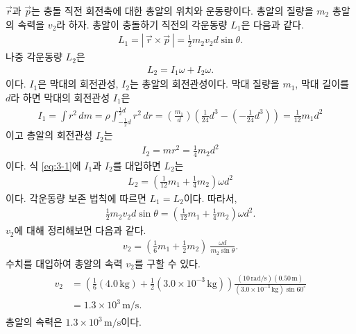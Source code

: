 \documentclass[floatfix,nofootinbib,superscriptaddress,fleqn]{revtex4-2}
\begin{document}
$\vec{r}$과 $\vec{p}$는 충돌 직전 회전축에 대한 총알의 위치와 운동량이다.
 총알의 질량을 $m_2$ 총알의 속력을 $v_2$라 하자.
총알이 충돌하기 직전의 각운동량 $L_1$은 다음과 같다.
\begin{align}
  L_1 =|\,\vec{r}\times\vec{p}\,|=\frac{1}{2} m_2v_2d\sin\theta.
\end{align}
나중 각운동량 $L_2$은
\begin{align}\label{eq:3-1}
  L_2 = I_1\omega+ I_2\omega.
\end{align}
이다. $I_1$은 막대의 회전관성, $I_2$는 총알의 회전관성이다.
막대 질량을 $m_1$, 막대 길이를 $d$라 하면 막대의 회전관성 $I_1$은
\begin{align}
  I_1 = \int r^2\,dm = \rho\int_{-\frac{1}{2}d} ^{\frac{1}{2}d}r^2\,dr
  =\left(\frac{m_1}{d}\right)\left(\frac{1}{24}d^3
  -\left(-\frac{1}{24}d^3\right)\right)
  =\frac{1}{12}m_1d^2
\end{align}
이고 총알의 회전관성 $I_2$는
\begin{align}
  I_2 =  mr^2 = \frac{1}{4}m_2d^2
\end{align}
이다. 식 \eqref{eq:3-1}에 $I_1$과 $I_2$를 대입하면 $L_2$는
\begin{align}
  L_2 = \left(\frac{1}{12}m_1+\frac{1}{4}m_2\right)\omega d^2
\end{align}
이다. 각운동량 보존 법칙에 따르면 $L_1=L_2$이다. 따라서,
\begin{align}
  \frac{1}{2}m_2v_2d\sin\theta=\left(\frac{1}{12}m_1
  +\frac{1}{4}m_2\right)\omega d^2.
\end{align}
$v_2$에 대해 정리해보면 다음과 같다.
\begin{align}
  v_2 = \left(\frac{1}{6}m_1+\frac{1}{2}m_2\right)\
  \frac{\omega d}{m_2\sin\theta}.
\end{align}
수치를 대입하여 총알의 속력 $v_2$를 구할 수 있다.
\begin{align}
  \begin{split}
    v_2 &= \left(\frac{1}{6}(4.0\,\mathrm{kg})
    +\frac{1}{2}(3.0\times 10^{-3}\,\mathrm{kg})\right)
    \frac{(10\,\mathrm{rad/s}) (0.50\,\mathrm{m})}
    {(3.0\times 10^{-3}\,\mathrm{kg})\sin{60^\circ}}  \\
    &= 1.3\times 10^3\,\mathrm{m/s}.
  \end{split}
\end{align}
총알의 속력은 $1.3\times 10^3\,\mathrm{m/s}$이다.
\vspace{1.cm}
\end{document}
